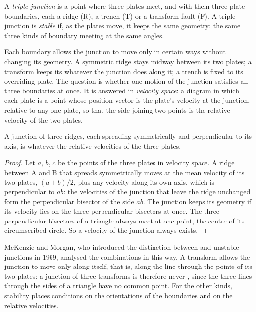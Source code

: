 \begin{definition}\label{def:b1:plate-kinematics:triple-junction}
A \emph{triple junction} is a point where three plates
meet, and with them three plate boundaries, each a ridge (R), a trench (T) or a
transform fault (F). A triple junction is \emph{stable} if, as the plates move, it keeps the same geometry: the same three
kinds of boundary meeting at the same angles.
\end{definition}

Each boundary allows the junction to move only in certain ways without changing
its geometry. A symmetric ridge stays midway between its two plates; a
transform keeps its  whatever the junction does along it; a trench is
fixed to its overriding plate. The question is whether one motion of the
junction satisfies all three boundaries at once. It is answered in
\emph{velocity space}: a diagram in which each plate is a point whose position
vector is the plate's velocity at the junction, relative to any one plate, so
that the side joining two points is the relative velocity of the two plates.

\begin{proposition}\label{prop:b1:plate-kinematics:rrr}
A junction of three ridges, each spreading symmetrically and perpendicular to
its axis, is  whatever the relative velocities of the three plates.
\end{proposition}

\begin{proof}
Let $a$, $b$, $c$ be the points of the three plates in velocity space. A ridge
between A and B that spreads symmetrically moves at the mean velocity of its
two plates, $(a + b)/2$, plus any velocity along its own axis, which is
perpendicular to $ab$: the velocities of the junction that leave the ridge
unchanged form the perpendicular bisector of the side $ab$. The junction keeps
its geometry if its velocity lies on the three perpendicular bisectors at once.
The three perpendicular bisectors of a triangle always meet at one point, the
centre of its circumscribed circle. So a velocity of the junction always
exists.
\end{proof}

McKenzie and Morgan, who introduced the distinction between  and unstable
junctions in 1969, analysed the combinations in this way. A transform allows the
junction to move only along itself, that is, along the line through the points
of its two plates: a junction of three transforms is therefore never ,
since the three lines through the sides of a triangle have no common point. For
the other kinds, stability places conditions on the orientations of the
boundaries and on the relative velocities.

